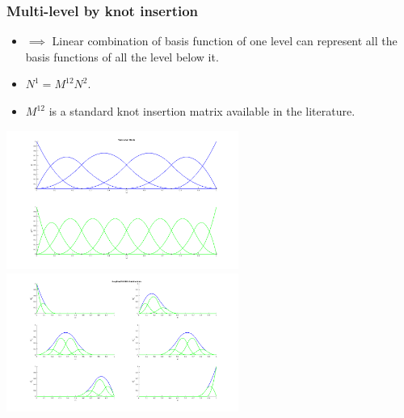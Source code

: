 \documentclass{beamer}
\begin{document}
\begin{frame}
	\frametitle{Multi-level by knot insertion}
	
	\begin{itemize}
	\item $ \implies $ Linear combination of basis function of one level can represent all the basis functions of all the level below it.
	\item $ N^1 = M^{12} N^2 $.
	\item $ M^{12} $ is a standard knot insertion matrix available in the literature.%

\end{itemize}
	\includegraphics[width=0.57\textwidth]{pics/refinement.png}%
	\hspace{-1.8cm}%
	\includegraphics[width=0.57\textwidth]{pics/refinementf.png}
\end{frame}
\end{document}
